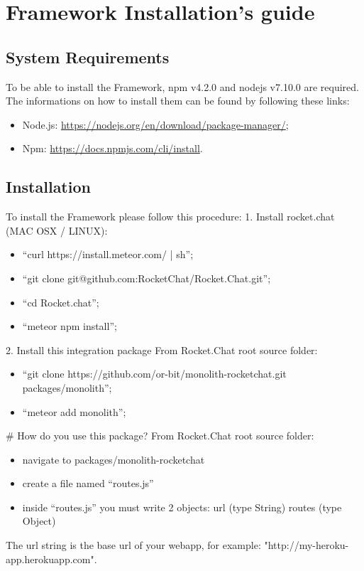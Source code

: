 \section{Framework Installation's guide}

\subsection{System Requirements}
To be able to install the Framework, npm v4.2.0 and nodejs v7.10.0 are required. The informations on how to install them can be found by following these links:
\begin{itemize}
	\item Node.js: \url{https://nodejs.org/en/download/package-manager/};
	\item Npm: \url{https://docs.npmjs.com/cli/install}.
\end{itemize}

\subsection{Installation}

To install the Framework  please follow this procedure:
1. Install rocket.chat (MAC OSX / LINUX):
\begin{itemize}
    \item ``curl https://install.meteor.com/ | sh'';
    \item ``git clone git@github.com:RocketChat/Rocket.Chat.git'';
    \item ``cd Rocket.chat'';
    \item ``meteor npm install''; 
\end{itemize}

2. Install this integration package
  From Rocket.Chat root source folder:
 \begin{itemize}
    \item ``git clone https://github.com/or-bit/monolith-rocketchat.git packages/monolith'';
    \item ``meteor add monolith'';
\end{itemize}

# How do you use this package?
From Rocket.Chat root source folder:
\begin{itemize}
\item navigate to packages/monolith-rocketchat
\item create a file named ``routes.js''
\item inside ``routes.js'' you must write 2 objects:   url (type String)  routes (type Object)
\end{itemize}

The url string is the base url of your webapp, for example: "http://my-heroku-app.herokuapp.com".
